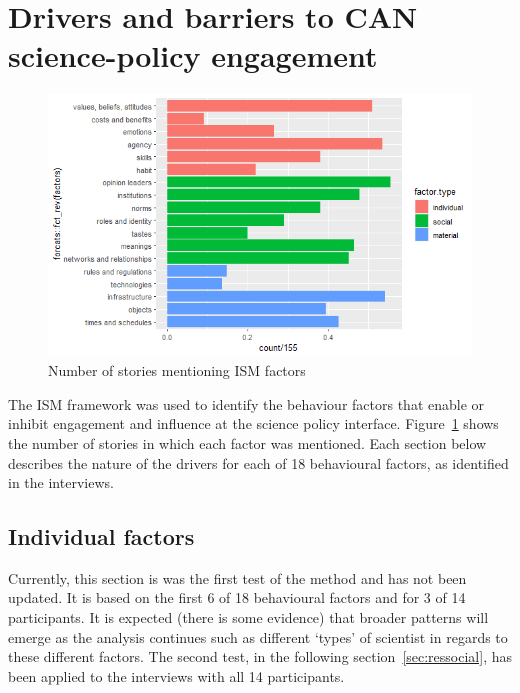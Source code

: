 \section{Drivers and barriers to CAN science-policy engagement}\label{sec:resultsISM}

\begin{figure}[!ht]
    \centering
    \includegraphics[width=1\linewidth]{figures/ism_count_per_story.png}
    \caption{Number of stories mentioning ISM factors}
    \label{fig:ismstorycount}
\end{figure}

The ISM framework was used to identify the behaviour factors that enable or inhibit engagement and influence at the science policy interface. Figure~\ref{fig:ismstorycount} shows the number of stories in which each factor was mentioned. Each section below describes the nature of the drivers for each of 18 behavioural factors, as identified in the interviews.


\subsection{Individual factors}\label{sec:resindividual}

Currently, this section is was the first test of the method and has not been updated. It is based on the first 6 of 18 behavioural factors and for 3 of 14 participants. It is expected (there is some evidence) that broader patterns will emerge as the analysis continues such as different `types' of scientist in regards to these different factors. The second test, in the following section~\ref{sec:ressocial}, has been applied to the interviews with all 14 participants.

